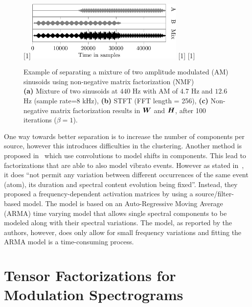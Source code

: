 \begin{figure}[H]
\centering
{}%
[1\textwidth]{\includegraphics[width=0.7\textwidth]{Chapters/05_Separation_Known/figures/Timepdf-crop.pdf}}%
\hspace{0.2\textwidth} %
[1\textwidth]{}%
\hspace{0.3\textwidth} %
[1\textwidth]{}%
\caption{Example of separating a mixture of two amplitude modulated (AM) sinusoids using non-negative matrix factorization (NMF)\\ \textbf{(a)} Mixture of two sinusoids at $440$ Hz with AM of $4.7$ Hz and $12.6$ Hz (sample rate=$8$ kHz), \textbf{(b)} STFT (FFT length = 256), \textbf{(c)} Non-negative matrix factorization results in ${\bm{W}}$ and ${\bm{H}}$, after 100 iterations ($\beta = 1$).}
\label{fig:am_tensor_nmf}
\end{figure}

One way towards better separation is to increase the number of components per source, however this introduces difficulties in the clustering.
Another method is proposed in~\cite{smaragdis04, fitzgerald05s, jaiswal13, rodriguezserrano16} which use convolutions to model shifts in components.
This lead to factorizations that are able to also model vibrato events.
However as stated in~\cite{hennequin11}, it does ``not  permit  any variation  between  different  occurrences  of  the  same  event (atom), its duration and spectral content evolution being fixed''. 
Instead, they proposed a frequency-dependent activation matrices by using a source/filter-based model.
The model is based on an Auto-Regressive Moving Average (ARMA) time varying model that allows single spectral components to be modeled along with their spectral variations. 
The model, as reported by the authors, however, does only allow for small frequency variations and fitting the ARMA model is a time-consuming process.

\section{Tensor Factorizations for Modulation Spectrograms}
\label{sub:am}

